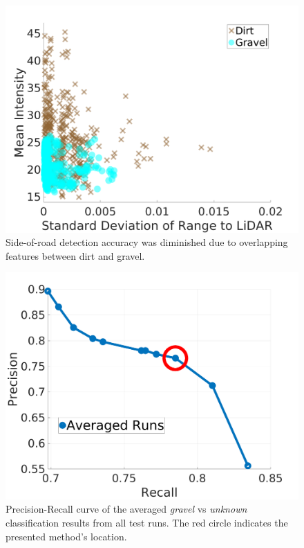\documentclass[journal,onecolumn]{IEEEtran}
\begin{document}
		\begin{figure}[H]
			\centering
			\includegraphics[width=0.75\linewidth]{figures/dirt_v_gravel_3}
			\caption[Re-grassed Dirt vs Gravel]{Side-of-road detection accuracy was diminished due to overlapping features between dirt and gravel. }
			\label{fig:dirt_v_gravel}
		\end{figure}

		
	
		\begin{figure}[H]
			\centering
			\includegraphics[width=0.75\linewidth]{figures/precision_recall_curve_averaged_marked}
			\caption[PR Curve]{Precision-Recall curve of the averaged \textit{gravel} vs \textit{unknown} classification results from all test runs. The red circle indicates the presented method's location.}
			\label{fig:precision_recall_curve_averaged}
		\end{figure}
\end{document}
